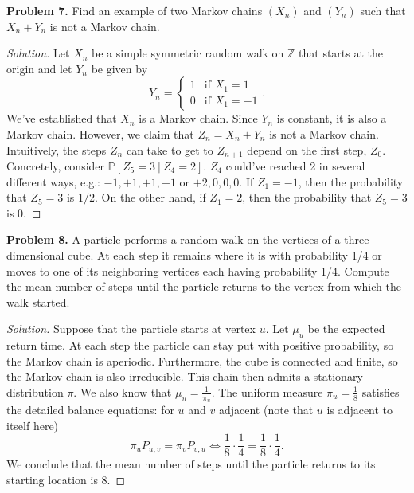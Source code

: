 \documentclass[11pt,letterpaper]{report}
\newcommand{\integers}{\mathbb{Z}}
\newcommand{\Prob}{\mathbb{P}}
\newenvironment{solution}
{\begin{proof}[Solution]}
{\end{proof}}
\begin{document}
\noindent\textbf{Problem 7. }
Find an example of two Markov chains $(X_n)$ and $(Y_n)$ such that $X_n+Y_n$ is not a Markov chain.
\begin{solution}
	Let $X_n$ be a simple symmetric random walk on $\integers$ that starts at the origin and let $Y_n$ be given by
	\[
	Y_n = \begin{cases}
		1&\text{if }X_1 = 1\\
		0&\text{if }X_1 = -1
	\end{cases}.
	\]
	We've established that $X_n$ is a Markov chain. Since $Y_n$ is constant, it is also a Markov chain. However, we claim that $Z_n = X_n+Y_n$ is not a Markov chain. Intuitively, the steps $Z_n$ can take to get to $Z_{n+1}$ depend on the first step, $Z_0$. Concretely, consider $\Prob[Z_5 = 3\ |\ Z_4 = 2]$. $Z_4$ could've reached 2 in several different ways, e.g.: $-1, +1, +1, +1$ or $+2,0, 0, 0$. If $Z_1 = -1$, then the probability that $Z_5=3$ is $1/2$. On the other hand, if $Z_1 = 2$, then the probability that $Z_5 = 3$ is $0$.
\end{solution}

\noindent\textbf{Problem 8. }
A particle performs a random walk on the vertices of a three-dimensional cube. At each step it remains where it is with probability 1/4 or moves to one of its neighboring vertices each having probability 1/4. Compute the mean number of steps until the particle returns to the vertex from which the walk started.
\begin{solution}
	Suppose that the particle starts at vertex $u$. Let $\mu_u$ be the expected return time. At each step the particle can stay put with positive probability, so the Markov chain is aperiodic. Furthermore, the cube is connected and finite, so the Markov chain is also irreducible. This chain then admits a stationary distribution $\pi$. We also know that $\mu_u = \frac{1}{\pi_u}$. The uniform measure $\pi_u = \frac{1}{8}$ satisfies the detailed balance equations: for $u$ and $v$ adjacent (note that $u$ is adjacent to itself here)
	\[
		\pi_uP_{u,v} = \pi_vP_{v,u} \iff \frac{1}{8}\cdot \frac{1}{4} = \frac{1}{8}\cdot \frac{1}{4}.
	\]
	We conclude that the mean number of steps until the particle returns to its starting location is 8.
\end{solution}
\end{document}
